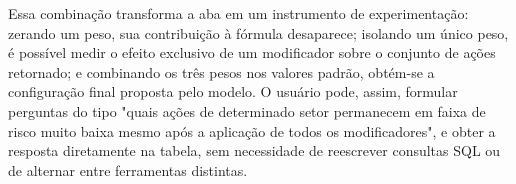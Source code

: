 Essa combinação transforma a aba em um instrumento de experimentação: zerando um peso, sua contribuição à fórmula desaparece; isolando um único peso, é possível medir o efeito exclusivo de um modificador sobre o conjunto de ações retornado; e combinando os três pesos nos valores padrão, obtém-se a configuração final proposta pelo modelo. O usuário pode, assim, formular perguntas do tipo "quais ações de determinado setor permanecem em faixa de risco muito baixa mesmo após a aplicação de todos os modificadores", e obter a resposta diretamente na tabela, sem necessidade de reescrever consultas SQL ou de alternar entre ferramentas distintas.
